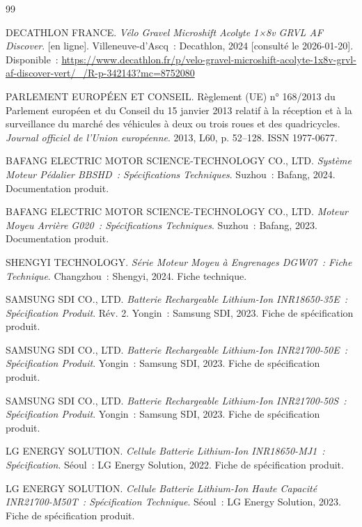 \documentclass[12pt,a4paper]{article}
\begin{document}
\begin{thebibliography}{99}

DECATHLON FRANCE. \textit{Vélo Gravel Microshift Acolyte 1×8v GRVL AF Discover}. [en ligne]. Villeneuve-d'Ascq~: Decathlon, 2024 [consulté le 2026-01-20]. Disponible~: \url{https://www.decathlon.fr/p/velo-gravel-microshift-acolyte-1x8v-grvl-af-discover-vert/_/R-p-342143?mc=8752080}

PARLEMENT EUROPÉEN ET CONSEIL. Règlement (UE) n° 168/2013 du Parlement européen et du Conseil du 15 janvier 2013 relatif à la réception et à la surveillance du marché des véhicules à deux ou trois roues et des quadricycles. \textit{Journal officiel de l'Union européenne}. 2013, L60, p. 52--128. ISSN 1977-0677.

BAFANG ELECTRIC MOTOR SCIENCE-TECHNOLOGY CO., LTD. \textit{Système Moteur Pédalier BBSHD~: Spécifications Techniques}. Suzhou~: Bafang, 2024. Documentation produit.

BAFANG ELECTRIC MOTOR SCIENCE-TECHNOLOGY CO., LTD. \textit{Moteur Moyeu Arrière G020~: Spécifications Techniques}. Suzhou~: Bafang, 2023. Documentation produit.

SHENGYI TECHNOLOGY. \textit{Série Moteur Moyeu à Engrenages DGW07~: Fiche Technique}. Changzhou~: Shengyi, 2024. Fiche technique.

SAMSUNG SDI CO., LTD. \textit{Batterie Rechargeable Lithium-Ion INR18650-35E~: Spécification Produit}. Rév. 2. Yongin~: Samsung SDI, 2023. Fiche de spécification produit.

SAMSUNG SDI CO., LTD. \textit{Batterie Rechargeable Lithium-Ion INR21700-50E~: Spécification Produit}. Yongin~: Samsung SDI, 2023. Fiche de spécification produit.

SAMSUNG SDI CO., LTD. \textit{Batterie Rechargeable Lithium-Ion INR21700-50S~: Spécification Produit}. Yongin~: Samsung SDI, 2023. Fiche de spécification produit.

LG ENERGY SOLUTION. \textit{Cellule Batterie Lithium-Ion INR18650-MJ1~: Spécification}. Séoul~: LG Energy Solution, 2022. Fiche de spécification produit.

LG ENERGY SOLUTION. \textit{Cellule Batterie Lithium-Ion Haute Capacité INR21700-M50T~: Spécification Technique}. Séoul~: LG Energy Solution, 2023. Fiche de spécification produit.


\end{thebibliography}
\end{document}
